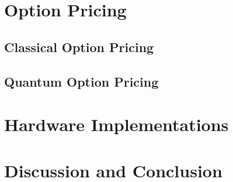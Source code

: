 \documentclass[prx,twocolumn,floatfix,superscriptaddress,longbibliography]{revtex4-1}
\begin{document}
\section{Option Pricing}\label{sec:literature2}

\subsection{Classical Option Pricing}

\subsection{Quantum Option Pricing}


\section{Hardware Implementations}\label{sec:hardware}




\section{Discussion and Conclusion}\label{sec:discussion}



\FloatBarrier


\end{document}
